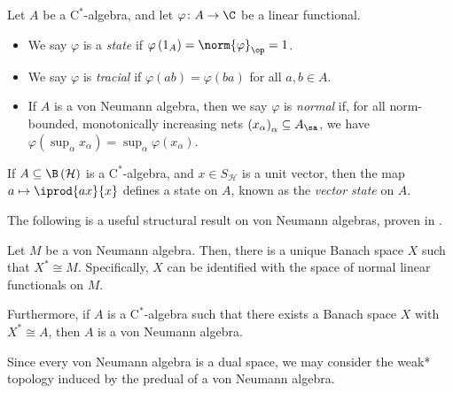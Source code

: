 \begin{definition}\label{def:state_linear_functional}
  Let $A$ be a $\mathrm{C}^{\ast}$-algebra, and let $\varphi\colon A\rightarrow \C$ be a linear functional. 
  \begin{itemize}
    \item We say $\varphi$ is a \textit{state} if $\varphi\left( 1_A \right) = \norm{\varphi}_{\op} = 1$.
    \item We say $\varphi$ is \textit{tracial} if $\varphi\left( ab \right) = \varphi\left( ba \right)$ for all $a,b\in A$.
    \item If $A$ is a von Neumann algebra, then we say $\varphi$ is \textit{normal} if, for all norm-bounded, monotonically increasing nets $\left( x_{\alpha} \right)_{\alpha}\subseteq A_{\sa}$, we have $\varphi\left( \sup_{\alpha}x_{\alpha} \right) = \sup_{\alpha}\varphi\left( x_{\alpha} \right)$.
  \end{itemize}
\end{definition}
\begin{example}
  If $A\subseteq \B\left( \mathcal{H} \right)$ is a $\mathrm{C}^{\ast}$-algebra, and $x\in S_{\mathcal{H}}$ is a unit vector, then the map $a\mapsto \iprod{ax}{x}$ defines a state on $A$, known as the \textit{vector state} on $A$.
\end{example}
The following is a useful structural result on von Neumann algebras, proven in \cite[Section III.2.4]{blackadar_operator_algebras}.
\begin{theorem}
  Let $M$ be a von Neumann algebra. Then, there is a unique Banach space $X$ such that $X^{\ast}\cong M$. Specifically, $X$ can be identified with the space of normal linear functionals on $M$.\newline

  Furthermore, if $A$ is a $\mathrm{C}^{\ast}$-algebra such that there exists a Banach space $X$ with $X^{\ast}\cong A$, then $A$ is a von Neumann algebra.
\end{theorem}
Since every von Neumann algebra is a dual space, we may consider the weak* topology induced by the predual of a von Neumann algebra.
